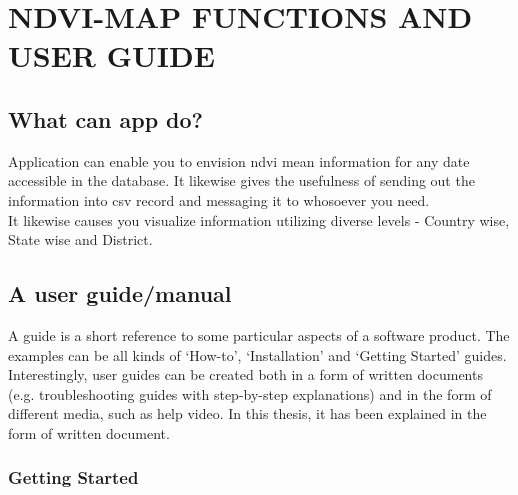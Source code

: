 \chapter{NDVI-MAP FUNCTIONS AND USER GUIDE}
\label{chap:ndvi & it's user guide}

\section{What can app do?}

Application can enable you to envision \gls{ndvi} mean information for any date accessible in the database. It likewise gives the usefulness of sending out the information into \gls{csv} record and messaging it to whosoever you need. \\
It likewise causes you visualize information utilizing diverse levels - Country wise, State wise and District.

\section{A user guide/manual}

A guide is a short reference to some particular aspects of a software product. The examples can be all kinds of ‘How-to’, ‘Installation’ and ‘Getting Started’ guides. Interestingly, user guides can be created both in a form of written documents (e.g. troubleshooting guides with step-by-step explanations) and in the form of different media, such as help video. In this thesis, it has been explained in the form of written document.

\subsection{Getting Started}


